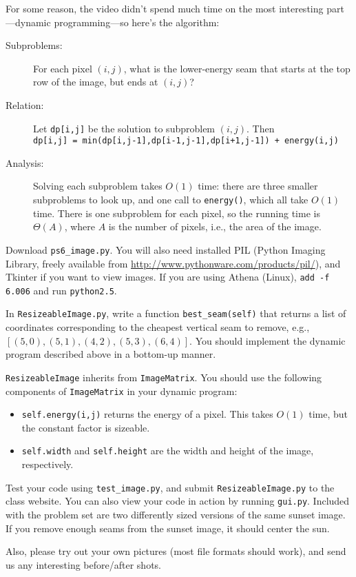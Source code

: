 \documentclass[12pt,twoside]{article}
\begin{document}
\begin{enumerate}
  For some reason, the video didn't spend much time on the most
  interesting part---dynamic programming---so here's the algorithm:

  \begin{description}
  \item[Subproblems:] For each pixel $(i,j)$, what is the lower-energy
    seam that starts at the top row of the image, but ends at $(i,j)$?
  \item[Relation:] Let \verb|dp[i,j]| be the solution to subproblem
  $(i,j)$. Then \\
  \verb|dp[i,j] = min(dp[i,j-1],dp[i-1,j-1],dp[i+1,j-1]) + energy(i,j)|
  \item[Analysis:] Solving each subproblem takes $O(1)$ time: there
    are three smaller subproblems to look up, and one call to
    \verb|energy()|, which all take $O(1)$ time. There is one
    subproblem for each pixel, so the running time is $\Theta(A)$,
    where $A$ is the number of pixels, i.e., the area of the image.
  \end{description}

  Download \verb|ps6_image.py|. You will also need installed PIL
  (Python Imaging Library, freely available from
  \url{http://www.pythonware.com/products/pil/}), and Tkinter if you
  want to view images.  If you are using Athena (Linux),
  \verb|add -f 6.006| and run \verb|python2.5|.

  In \verb|ResizeableImage.py|, write a function
  \verb|best_seam(self)| that returns a list of coordinates
  corresponding to the cheapest vertical seam to remove, e.g., \\
  $[(5,0), (5,1), (4,2), (5,3), (6,4)]$.  You should implement the
  dynamic program described above in a bottom-up manner.

  \verb|ResizeableImage| inherits from \verb|ImageMatrix|.  You should
  use the following components of \verb|ImageMatrix| in your dynamic
  program:
  \begin{itemize}
  \item \verb|self.energy(i,j)| returns the energy of a pixel. This
  takes $O(1)$ time, but the constant factor is sizeable.
  \item \verb|self.width| and \verb|self.height| are the width and height
        of the image, respectively.
  \end{itemize}

  Test your code using \verb|test_image.py|, and submit
  \verb|ResizeableImage.py| to the class website. You can also view
  your code in action by running \verb|gui.py|. Included with the
  problem set are two differently sized versions of the same sunset
  image. If you remove enough seams from the sunset image, it should
  center the sun.

  Also, please try out your own pictures (most file formats should
  work), and send us any interesting before/after shots.

\end{enumerate}
\end{document}
